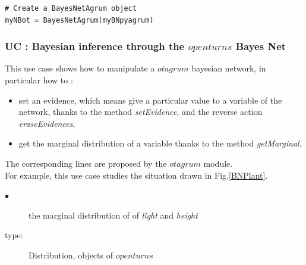 \begin{lstlisting}
# Create a BayesNetAgrum object
myNBot = BayesNetAgrum(myBNpyagrum)
\end{lstlisting}


\newpage \subsubsection{UC : Bayesian inference through the  $openturns$ Bayes Net}

This use case shows how to manipulate a $otagrum$ bayesian network, in particular how to : 
\begin{itemize}
  \item set an evidence, which means give a particular value to a variable of the network, thanks to the method {\itshape setEvidence}, and the reverse action {\itshape eraseEvidences},
  \item get the marginal distribution of a variable thanks to the method {\itshape getMarginal}.
\end{itemize}

The corresponding lines are  proposed by the $otagrum$ module.\\

For example, this use case studies the  situation drawn in Fig.\ref{BNPlant}.\\

{
  \begin{description}
  \item[$\bullet$] the marginal distribution of of {\itshape light} and {\itshape height} 
  \item[type:]  Distribution, objects of $openturns$
  \end{description}
}


